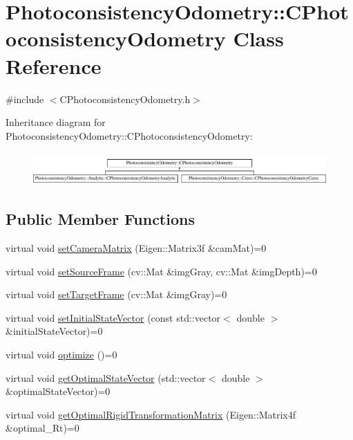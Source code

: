 \hypertarget{class_photoconsistency_odometry_1_1_c_photoconsistency_odometry}{
\section{PhotoconsistencyOdometry::CPhotoconsistencyOdometry Class Reference}
\label{class_photoconsistency_odometry_1_1_c_photoconsistency_odometry}
}


{\ttfamily \#include $<$CPhotoconsistencyOdometry.h$>$}

Inheritance diagram for PhotoconsistencyOdometry::CPhotoconsistencyOdometry:\begin{figure}[H]
\begin{center}
\leavevmode
\includegraphics[height=1.269841cm]{class_photoconsistency_odometry_1_1_c_photoconsistency_odometry}
\end{center}
\end{figure}
\subsection*{Public Member Functions}
\begin{DoxyCompactItemize}
\item 
virtual void \hyperlink{class_photoconsistency_odometry_1_1_c_photoconsistency_odometry_a7464fc533b08dc7150eabd1086b84155}{setCameraMatrix} (Eigen::Matrix3f \&camMat)=0
\item 
virtual void \hyperlink{class_photoconsistency_odometry_1_1_c_photoconsistency_odometry_aa017bf63aeb6f3103d1b6fec8d38a888}{setSourceFrame} (cv::Mat \&imgGray, cv::Mat \&imgDepth)=0
\item 
virtual void \hyperlink{class_photoconsistency_odometry_1_1_c_photoconsistency_odometry_a4f04b88ac54670b03b5c2bf773bca018}{setTargetFrame} (cv::Mat \&imgGray)=0
\item 
virtual void \hyperlink{class_photoconsistency_odometry_1_1_c_photoconsistency_odometry_a425e6bc2fbbc9dcf924ae197f5569ddf}{setInitialStateVector} (const std::vector$<$ double $>$ \&initialStateVector)=0
\item 
virtual void \hyperlink{class_photoconsistency_odometry_1_1_c_photoconsistency_odometry_aa7b0f04764e2c348556193281de58639}{optimize} ()=0
\item 
virtual void \hyperlink{class_photoconsistency_odometry_1_1_c_photoconsistency_odometry_a60e50c92161d1c2c1090757358ddba92}{getOptimalStateVector} (std::vector$<$ double $>$ \&optimalStateVector)=0
\item 
virtual void \hyperlink{class_photoconsistency_odometry_1_1_c_photoconsistency_odometry_a319f97afb21523fa6c66e9a04a607ea6}{getOptimalRigidTransformationMatrix} (Eigen::Matrix4f \&optimal\_\-Rt)=0
\end{DoxyCompactItemize}


